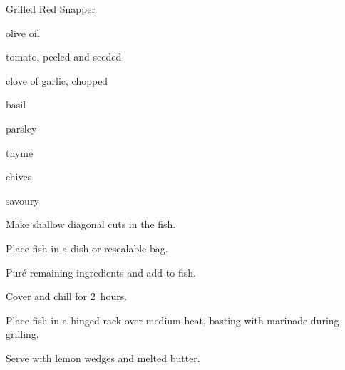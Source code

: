 \begin{recipe}{Grilled Red Snapper}{}{}

\begin{ingredients}
\item {} 
\item \C{\half} olive oil
\item tomato, peeled and seeded
\item clove of garlic, chopped
\item {} basil
\item {} parsley
\item {} thyme
\item {} chives
\item {} savoury
\end{ingredients}

\begin{directions}
\item Make shallow diagonal cuts in the fish.
\item Place fish in a dish or resealable bag.
\item Pur\'e remaining ingredients and add to fish.
\item Cover and chill for 2~hours.
\item Place fish in a hinged rack over medium heat, basting with marinade during grilling.
\item Serve with lemon wedges and melted butter.
\end{directions}

\end{recipe}
